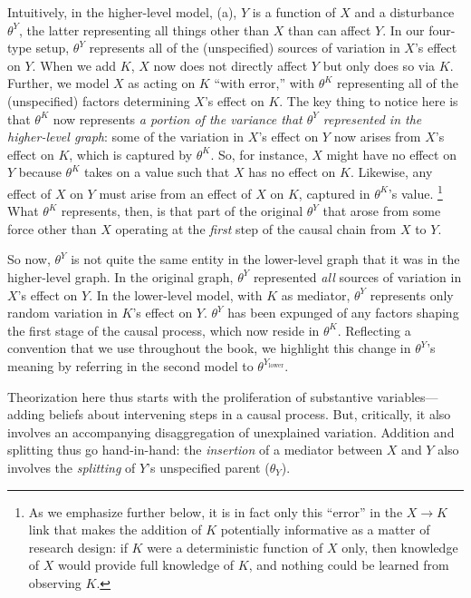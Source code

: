 \documentclass[12pt,]{book}
\let\rmarkdownfootnote\footnote%
\def\footnote{\protect\rmarkdownfootnote}
\begin{document}
Intuitively, in the higher-level model, (a), \(Y\) is a function of \(X\) and a disturbance \(\theta^Y\), the latter representing all things other than \(X\) than can affect \(Y\). In our four-type setup, \(\theta^Y\) represents all of the (unspecified) sources of variation in \(X\)'s effect on \(Y\). When we add \(K\), \(X\) now does not directly affect \(Y\) but only does so via \(K\). Further, we model \(X\) as acting on \(K\) ``with error,'' with \(\theta^K\) representing all of the (unspecified) factors determining \(X\)'s effect on \(K\). The key thing to notice here is that \(\theta^K\) now represents \emph{a portion of the variance that \(\theta^Y\) represented in the higher-level graph}: some of the variation in \(X\)'s effect on \(Y\) now arises from \(X\)'s effect on \(K\), which is captured by \(\theta^K\). So, for instance, \(X\) might have no effect on \(Y\) because \(\theta^K\) takes on a value such that \(X\) has no effect on \(K\). Likewise, any effect of \(X\) on \(Y\) must arise from an effect of \(X\) on \(K\), captured in \(\theta^K\)'s value. \footnote{As we emphasize further below, it is in fact only this ``error'' in the \(X\rightarrow K\) link that makes the addition of \(K\) potentially informative as a matter of research design: if \(K\) were a deterministic function of \(X\) only, then knowledge of \(X\) would provide full knowledge of \(K\), and nothing could be learned from observing \(K\).} What \(\theta^K\) represents, then, is that part of the original \(\theta^Y\) that arose from some force other than \(X\) operating at the \emph{first} step of the causal chain from \(X\) to \(Y\).

So now, \(\theta^Y\) is not quite the same entity in the lower-level graph that it was in the higher-level graph. In the original graph, \(\theta^Y\) represented \emph{all} sources of variation in \(X\)'s effect on \(Y\). In the lower-level model, with \(K\) as mediator, \(\theta^Y\) represents only random variation in \(K\)'s effect on \(Y\). \(\theta^Y\) has been expunged of any factors shaping the first stage of the causal process, which now reside in \(\theta^K\). Reflecting a convention that we use throughout the book, we highlight this change in \(\theta^Y\)'s meaning by referring in the second model to \(\theta^{Y_\text{lower}}\).

Theorization here thus starts with the proliferation of substantive variables---adding beliefs about intervening steps in a causal process. But, critically, it also involves an accompanying disaggregation of unexplained variation. Addition and splitting thus go hand-in-hand: the \emph{insertion} of a mediator between \(X\) and \(Y\) also involves the \emph{splitting} of \(Y\)'s unspecified parent (\(\theta_Y\)).
\end{document}
